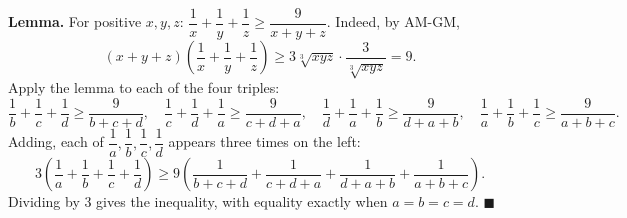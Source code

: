 \textbf{Lemma.} For positive $x,y,z$: $\dfrac1x+\dfrac1y+\dfrac1z\ge\dfrac{9}{x+y+z}$. Indeed, by AM-GM,
\[(x+y+z)\left(\dfrac1x+\dfrac1y+\dfrac1z\right)\ge3\sqrt[3]{xyz}\cdot\dfrac{3}{\sqrt[3]{xyz}}=9.\]
Apply the lemma to each of the four triples:
\[\dfrac1b+\dfrac1c+\dfrac1d\ge\dfrac{9}{b+c+d},\quad\dfrac1c+\dfrac1d+\dfrac1a\ge\dfrac{9}{c+d+a},\quad\dfrac1d+\dfrac1a+\dfrac1b\ge\dfrac{9}{d+a+b},\quad\dfrac1a+\dfrac1b+\dfrac1c\ge\dfrac{9}{a+b+c}.\]
Adding, each of $\dfrac1a,\dfrac1b,\dfrac1c,\dfrac1d$ appears three times on the left:
\[3\left(\dfrac1a+\dfrac1b+\dfrac1c+\dfrac1d\right)\ge9\left(\dfrac{1}{b+c+d}+\dfrac{1}{c+d+a}+\dfrac{1}{d+a+b}+\dfrac{1}{a+b+c}\right).\]
Dividing by $3$ gives the inequality, with equality exactly when $a=b=c=d$. $\blacksquare$
